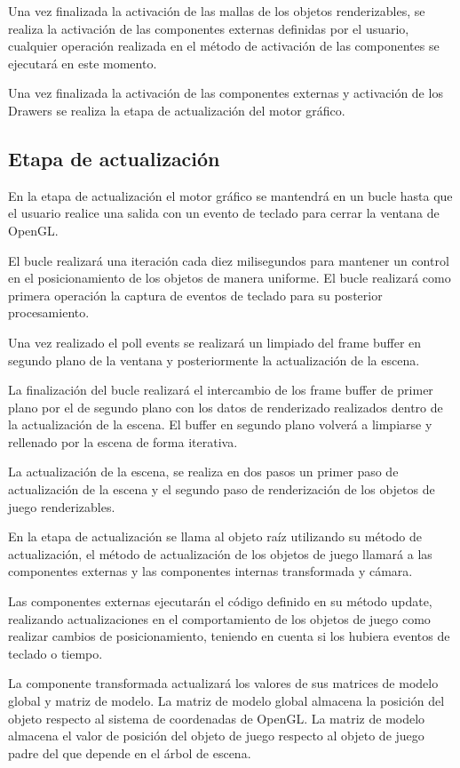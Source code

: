 \documentclass[a4paper, 17pt]{book}
\begin{document}
Una vez finalizada la activación de las mallas de los objetos renderizables, se realiza la activación de las componentes externas
definidas por el usuario, cualquier operación realizada en el método de activación de las componentes se ejecutará en este momento.

Una vez finalizada la activación de las componentes externas y activación de los Drawers se realiza la etapa de actualización del
motor gráfico.

\subsection{Etapa de actualización}
\label{subsec:actualizacion}

En la etapa de actualización el motor gráfico se mantendrá en un bucle hasta que el usuario realice una salida con un evento de teclado
para cerrar la ventana de OpenGL. 

El bucle realizará una iteración cada diez milisegundos para mantener un control en el posicionamiento de los objetos de manera uniforme.
El bucle realizará como primera operación la captura de eventos de teclado para su posterior procesamiento.
 
Una vez realizado el poll events se realizará un limpiado del frame buffer en segundo plano de la ventana y posteriormente la actualización
de la escena.

La finalización del bucle realizará el intercambio de los frame buffer de primer plano por el de segundo plano con los datos de renderizado
realizados dentro de la actualización de la escena. El buffer en segundo plano volverá a limpiarse y rellenado por la escena de forma iterativa.

La actualización de la escena, se realiza en dos pasos un primer paso de actualización de la escena y el segundo paso de renderización
de los objetos de juego renderizables.

En la etapa de actualización se llama al objeto raíz utilizando su método de actualización, el método de actualización de los objetos
de juego llamará a las componentes externas y las componentes internas transformada y cámara.

Las componentes externas ejecutarán el código definido en su método update, realizando actualizaciones en el comportamiento de los objetos
de juego como realizar cambios de posicionamiento, teniendo en cuenta si los hubiera eventos de teclado o tiempo.

La componente transformada actualizará los valores de sus matrices de modelo global y matriz de modelo. La matriz de modelo global almacena
la posición del objeto respecto al sistema de coordenadas de OpenGL. La matriz de modelo almacena el valor de posición del objeto de juego
respecto al objeto de juego padre del que depende en el árbol de escena.
\end{document}
